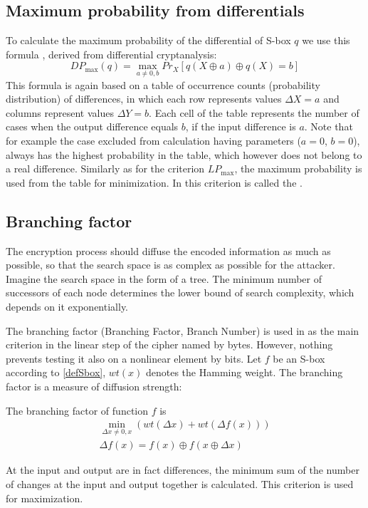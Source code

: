 \pagebreak

\subsection{Maximum probability from differentials}
To calculate the maximum probability of the differential of S-box $q$
we use this formula \cite{twofish}, derived from differential cryptanalysis:
\begin{equation}
  DP_{\max}(q) = \max_{a \neq 0 , b} Pr_X[q(X \oplus a) \oplus q(X) = b]
\end{equation}
This formula is again based on a table \cite{tutorialLADA} of occurrence counts
(probability distribution) of differences, in which each row represents values
$\Delta X = a$ and columns represent values $\Delta Y = b$.
Each cell of the table represents the number of cases when the
output difference equals $b$, if the input difference is $a$. Note that for example the case excluded
from calculation having parameters ($a = 0$, $b = 0$), always has the highest probability in the table,
which however does not belong to a real difference. Similarly as for the criterion $LP_{\max}$, the maximum
probability is used from the table for minimization.
In \cite{practicalSboxDesign} this criterion is called the .

\subsection{Branching factor}\label{secBF}
The encryption process should diffuse the encoded information as much as possible,
so that the search space is as complex as possible for the attacker. Imagine the
search space in the form of a tree. The minimum number of successors of each node
determines the lower bound of search complexity, which depends on it exponentially.

The branching factor (Branching Factor, Branch Number) is used in \cite{rijndael} as the main
criterion in the linear step of the cipher named  by bytes. However, nothing prevents
testing it also on a nonlinear element by bits.
Let $f$ be an S-box according to \ref{defSbox}, $wt(x)$ denotes the Hamming weight.
The branching factor is a measure of diffusion strength:

\begin{definition}
  The branching factor of function $f$ is
  \begin{eqnarray}
    \min_{\Delta x \neq 0, x} \left( wt(\Delta x) + wt(\Delta f(x)) \right)\\
    \Delta f(x) = f(x) \oplus f(x \oplus \Delta x)
  \end{eqnarray}
\end{definition}
At the input and output are in fact differences, the minimum sum of the number of changes at the input and output together is calculated.
This criterion is used for maximization.

